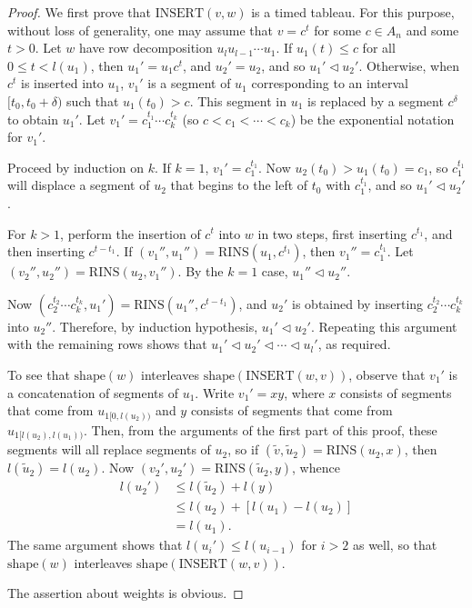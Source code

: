 \documentclass[10pt]{amsproc}
\theoremstyle{definition}
\theoremstyle{remark}
\newcommand{\rowins}{\mathrm{RINS}}
\newcommand{\ins}{\mathrm{INSERT}}
\newcommand{\shape}{\mathrm{shape}}
\begin{document}
\begin{proof}
  We first prove that $\ins(v,w)$ is a timed tableau.
  For this purpose, without loss of generality, one may assume that $v=c^t$ for some $c\in A_n$ and some $t>0$.
  Let $w$ have row decomposition $u_lu_{l-1}\dotsb u_1$.
  If $u_1(t)\leq c$ for all $0\leq t<l(u_1)$, then $u_1'=u_1c^t$, and $u_2'=u_2$, and so $u_1'\lhd u_2'$.
  Otherwise, when $c^t$ is inserted into $u_1$, $v_1'$ is a segment of $u_1$ corresponding to an interval $[t_0,t_0+\delta)$ such that $u_1(t_0)>c$.
  This segment in $u_1$ is replaced by a segment $c^\delta$ to obtain $u_1'$.
  Let $v_1'=c_1^{t_1}\dotsb c_k^{t_k}$ (so $c<c_1< \dotsb <c_k$) be the exponential notation for $v_1'$.

  Proceed by induction on $k$.
  If $k=1$, $v_1'=c_1^{t_1}$.
  Now $u_2(t_0)>u_1(t_0)=c_1$, so $c_1^{t_1}$ will displace a segment of $u_2$ that begins to the left of $t_0$ with $c_1^{t_1}$, and so $u_1'\lhd u_2'$.

  For $k>1$, perform the insertion of $c^t$ into $w$ in two steps, first inserting $c^{t_1}$, and then inserting $c^{t-t_1}$.
  If $(v_1'',u_1'')=\rowins(u_1,c^{t_1})$, then $v_1''=c_1^{t_1}$.
  Let $(v_2'',u_2'')=\rowins(u_2,v_1'')$.
  By the $k=1$ case, $u_1''\lhd u_2''$.
  
  Now $(c_2^{t_2}\dotsb c_k^{t_k},u_1')=\rowins(u_1'',c^{t-t_1})$, and $u_2'$ is obtained by inserting $c_2^{t_2}\dotsb c_k^{t_k}$ into $u_2''$.
  Therefore, by induction hypothesis, $u_1'\lhd u_2'$.
  Repeating this argument with the remaining rows shows that $u_1'\lhd u_2' \lhd \dotsb \lhd u_l'$, as required.

  To see that $\shape(w)$ interleaves $\shape(\ins(w,v))$, observe that $v_1'$ is a concatenation of segments of $u_1$.
  Write $v_1'=xy$, where $x$ consists of segments that come from $u_{1[0,l(u_2))}$ and $y$ consists of segments that come from $u_{1[l(u_2),l(u_1))}$.
  Then, from the arguments of the first part of this proof, these segments will all replace segments of $u_2$, so if $(\tilde v,\tilde u_2)=\rowins(u_2,x)$, then $l(\tilde u_2)=l(u_2)$.
  Now $(v_2',u_2')=\rowins(\tilde u_2,y)$, whence 
  \begin{align*}
    l(u_2') &\leq l(\tilde u_2)+l(y)\\
    &\leq l(u_2)+[l(u_1)-l(u_2)]\\
    & = l(u_1).
  \end{align*}
  The same argument shows that $l(u_i')\leq l(u_{i-1})$ for $i>2$ as well, so that $\shape(w)$ interleaves $\shape(\ins(w,v))$.

  The assertion about weights is obvious.
\end{proof}
\end{document}
